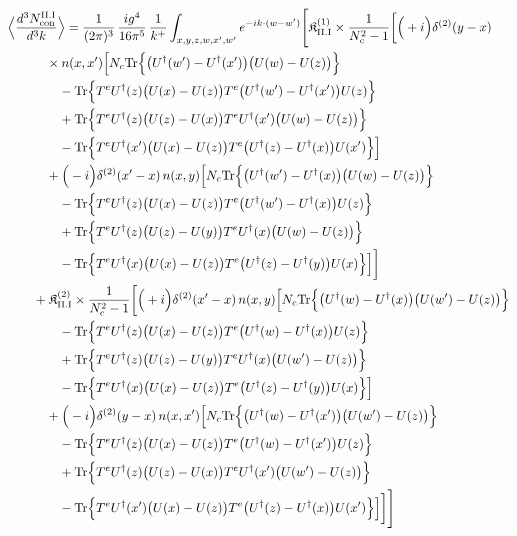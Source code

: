 \begingroup\small
\begin{align}\label{eq:S-II.I-2}
&\Big\langle\frac{d^{3}N^{\rm II.I}_{{\rm con}}}{d^{3}k}\Big\rangle=\frac{1}{(2\pi)^{3}}\, \frac{ig^{4}}{16\pi^{5}}\, \frac{1}{k^{+}} \int_{x,y,z,w,x',w'}e^{-ik\cdot(w-w')}\Bigg[ \mathfrak{K}^{(1)}_{\rm II.I} \times \frac{1}{N_{c}^{2}-1}\bigg[\Big(+i\Big)\delta^{(2)}(y-x)\notag\\
&\quad\quad\quad \times n(x,x')\Big[ N_{c}{\rm Tr}\Big\{\big(U^{\dagger}(w')-U^{\dagger}(x')\big)\big(U(w)-U(z)\big)\Big\}\notag\\
&\quad\quad\quad\quad -{\rm Tr}\Big\{T^{e}U^{\dagger}(z)\big(U(x)-U(z)\big)T^{e}\big(U^{\dagger}(w')-U^{\dagger}(x')\big)U(z)\Big\}\notag\\
&\quad\quad\quad\quad +{\rm Tr}\Big\{T^{e}U^{\dagger}(z)\big(U(z)-U(x)\big)T^{e}U^{\dagger}(x')\big(U(w)-U(z)\big)\Big\}\notag\\
&\quad\quad\quad\quad -{\rm Tr}\Big\{T^{e}U^{\dagger}(x')\big(U(x)-U(z)\big)T^{e}\big(U^{\dagger}(z)-U^{\dagger}(x)\big)U(x')\Big\}\Big]\notag\\
&\quad\quad\quad +\Big(-i\Big)\delta^{(2)}(x'-x)\, n(x,y)\Big[ N_{c}{\rm Tr}\Big\{\big(U^{\dagger}(w')-U^{\dagger}(x)\big)\big(U(w)-U(z)\big)\Big\}\notag\\
&\quad\quad\quad\quad -{\rm Tr}\Big\{T^{e}U^{\dagger}(z)\big(U(x)-U(z)\big)T^{e}\big(U^{\dagger}(w')-U^{\dagger}(x)\big)U(z)\Big\}\notag\\
&\quad\quad\quad\quad +{\rm Tr}\Big\{T^{e}U^{\dagger}(z)\big(U(z)-U(y)\big)T^{e}U^{\dagger}(x)\big(U(w)-U(z)\big)\Big\}\notag\\
&\quad\quad\quad\quad -{\rm Tr}\Big\{T^{e}U^{\dagger}(x)\big(U(x)-U(z)\big)T^{e}\big(U^{\dagger}(z)-U^{\dagger}(y)\big)U(x)\Big\}\Big]\bigg]\notag\\
&\quad\quad + \mathfrak{K}^{(2)}_{\rm II.I} \times \frac{1}{N_{c}^{2}-1}\bigg[\Big(+i\Big)\delta^{(2)}(x'-x)\, n(x,y)\Big[ N_{c}{\rm Tr}\Big\{\big(U^{\dagger}(w)-U^{\dagger}(x)\big)\big(U(w')-U(z)\big)\Big\}\notag\\
&\quad\quad\quad\quad -{\rm Tr}\Big\{T^{e}U^{\dagger}(z)\big(U(x)-U(z)\big)T^{e}\big(U^{\dagger}(w)-U^{\dagger}(x)\big)U(z)\Big\}\notag\\
&\quad\quad\quad\quad +{\rm Tr}\Big\{T^{e}U^{\dagger}(z)\big(U(z)-U(y)\big)T^{e}U^{\dagger}(x)\big(U(w')-U(z)\big)\Big\}\notag\\
&\quad\quad\quad\quad -{\rm Tr}\Big\{T^{e}U^{\dagger}(x)\big(U(x)-U(z)\big)T^{e}\big(U^{\dagger}(z)-U^{\dagger}(y)\big)U(x)\Big\}\Big]\notag\\
&\quad\quad\quad +\Big(-i\Big)\delta^{(2)}(y-x)\, n(x,x')\Big[ N_{c}{\rm Tr}\Big\{\big(U^{\dagger}(w)-U^{\dagger}(x')\big)\big(U(w')-U(z)\big)\Big\}\notag\\
&\quad\quad\quad\quad -{\rm Tr}\Big\{T^{e}U^{\dagger}(z)\big(U(x)-U(z)\big)T^{e}\big(U^{\dagger}(w)-U^{\dagger}(x')\big)U(z)\Big\}\notag\\
&\quad\quad\quad\quad +{\rm Tr}\Big\{T^{e}U^{\dagger}(z)\big(U(z)-U(x)\big)T^{e}U^{\dagger}(x')\big(U(w')-U(z)\big)\Big\}\notag\\
&\quad\quad\quad\quad -{\rm Tr}\Big\{T^{e}U^{\dagger}(x')\big(U(x)-U(z)\big)T^{e}\big(U^{\dagger}(z)-U^{\dagger}(x)\big)U(x')\Big\}\Big]\bigg]\Bigg]
\end{align}
\endgroup
